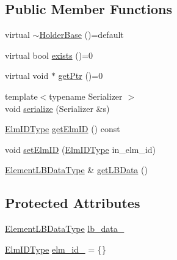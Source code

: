 \subsection*{Public Member Functions}
\begin{DoxyCompactItemize}
\item 
virtual \hyperlink{structvt_1_1objgroup_1_1holder_1_1_holder_base_a9388d2780a5ffa01677c3c535d42fbfa}{$\sim$\+Holder\+Base} ()=default
\item 
virtual bool \hyperlink{structvt_1_1objgroup_1_1holder_1_1_holder_base_afeebbe358baf0b2bfea57f52807be564}{exists} ()=0
\item 
virtual void $\ast$ \hyperlink{structvt_1_1objgroup_1_1holder_1_1_holder_base_a0b40d32b476b94586468abb5ae9a53a6}{get\+Ptr} ()=0
\item 
{\footnotesize template$<$typename Serializer $>$ }\\void \hyperlink{structvt_1_1objgroup_1_1holder_1_1_holder_base_a0d01f16a16316fab236b8753e7530efb}{serialize} (Serializer \&s)
\item 
\hyperlink{structvt_1_1objgroup_1_1holder_1_1_holder_base_a89c0ce1f23237ab00aee86d4d339bc50}{Elm\+I\+D\+Type} \hyperlink{structvt_1_1objgroup_1_1holder_1_1_holder_base_a36206831fe26ea16bd7bd3079bc45a8d}{get\+Elm\+ID} () const
\item 
void \hyperlink{structvt_1_1objgroup_1_1holder_1_1_holder_base_ac7bcdff4841dc78d23e7d96f7a383415}{set\+Elm\+ID} (\hyperlink{structvt_1_1objgroup_1_1holder_1_1_holder_base_a89c0ce1f23237ab00aee86d4d339bc50}{Elm\+I\+D\+Type} in\+\_\+elm\+\_\+id)
\item 
\hyperlink{structvt_1_1objgroup_1_1holder_1_1_holder_base_a53deb78d918d7281cf01a0f09e410411}{Element\+L\+B\+Data\+Type} \& \hyperlink{structvt_1_1objgroup_1_1holder_1_1_holder_base_aa4ebca4b40c0c1904650ea6a64342732}{get\+L\+B\+Data} ()
\end{DoxyCompactItemize}
\subsection*{Protected Attributes}
\begin{DoxyCompactItemize}
\item 
\hyperlink{structvt_1_1objgroup_1_1holder_1_1_holder_base_a53deb78d918d7281cf01a0f09e410411}{Element\+L\+B\+Data\+Type} \hyperlink{structvt_1_1objgroup_1_1holder_1_1_holder_base_a387f07d8e738b627a97ace582aa51430}{lb\+\_\+data\+\_\+}
\item 
\hyperlink{structvt_1_1objgroup_1_1holder_1_1_holder_base_a89c0ce1f23237ab00aee86d4d339bc50}{Elm\+I\+D\+Type} \hyperlink{structvt_1_1objgroup_1_1holder_1_1_holder_base_a0302cbe111e4bfa8cc8cd1fc47b39b27}{elm\+\_\+id\+\_\+} = \{\}
\end{DoxyCompactItemize}



